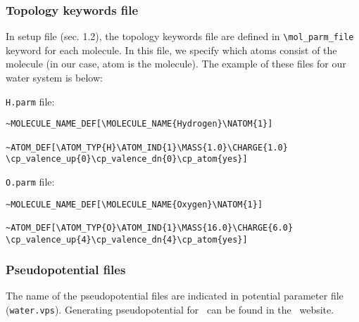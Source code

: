 \subsubsection{Topology keywords file}

In setup file (sec. 1.2), the topology keywords file are defined in \verb+\mol_parm_file+ keyword for each molecule. In this file, we specify which atoms consist of the molecule (in our case, atom is the molecule). The example of these files for our water system is below:

\verb+H.parm+ file:

\begin{verbatim}
~MOLECULE_NAME_DEF[\MOLECULE_NAME{Hydrogen}\NATOM{1}]

~ATOM_DEF[\ATOM_TYP{H}\ATOM_IND{1}\MASS{1.0}\CHARGE{1.0}
\cp_valence_up{0}\cp_valence_dn{0}\cp_atom{yes}]
\end{verbatim}

\verb+O.parm+ file:

\begin{verbatim}
~MOLECULE_NAME_DEF[\MOLECULE_NAME{Oxygen}\NATOM{1}]

~ATOM_DEF[\ATOM_TYP{O}\ATOM_IND{1}\MASS{16.0}\CHARGE{6.0}
\cp_valence_up{4}\cp_valence_dn{4}\cp_atom{yes}]
\end{verbatim}

\subsubsection{Pseudopotential files}
The name of the pseudopotential files are indicated in potential parameter file (\verb+water.vps+). Generating pseudopotential for \openatom \ can be found in the \openatom \ website.



%